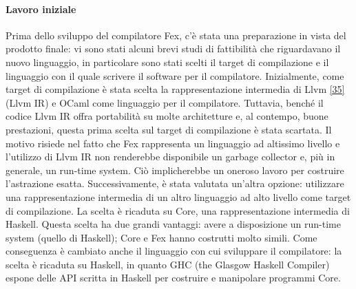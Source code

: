 \documentclass[10pt,a4paper]{article}
\begin{document}
\paragraph{Lavoro iniziale}
Prima dello sviluppo del compilatore Fex, c'è stata una preparazione in vista del prodotto finale: vi sono stati
alcuni brevi studi di fattibilità che riguardavano il nuovo linguaggio, in particolare sono stati scelti il target
di compilazione e il linguaggio con il quale scrivere il software per il compilatore. Inizialmente, come target di
compilazione è stata scelta la rappresentazione intermedia di Llvm \hyperlink{bibl35}{[35]} (Llvm IR) e OCaml come
linguaggio per il compilatore. Tuttavia, benché il codice Llvm IR offra portabilità su molte architetture e, al contempo,
buone prestazioni, questa prima scelta
sul target di compilazione è stata scartata. Il motivo risiede nel fatto che Fex rappresenta un linguaggio ad altissimo
livello e l'utilizzo di Llvm IR non renderebbe disponibile un garbage collector e, più in generale, un run-time system.
Ciò implicherebbe un oneroso lavoro per costruire l'astrazione esatta.
Successivamente, è stata valutata un'altra opzione: utilizzare una rappresentazione intermedia di un altro linguaggio ad alto
livello come target di compilazione. La scelta è ricaduta su Core, una rappresentazione intermedia di Haskell.
Questa scelta ha due grandi vantaggi: avere a disposizione un run-time system (quello di Haskell); Core e Fex hanno costrutti
molto simili.
Come conseguenza è cambiato anche il linguaggio con cui sviluppare il compilatore: la scelta è ricaduta su Haskell,
in quanto GHC (the Glasgow Haskell Compiler) espone delle API scritta in Haskell per costruire e manipolare
programmi Core.
\end{document}
